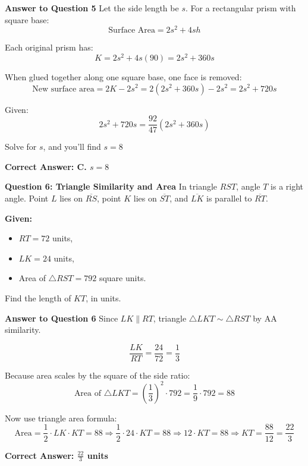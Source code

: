 \documentclass{beamer}
\begin{document}
\begin{frame}{\textbf{Answer to Question 5}}
Let the side length be \( s \). For a rectangular prism with square base:
\[
\text{Surface Area} = 2s^2 + 4sh
\]

Each original prism has:
\[
K = 2s^2 + 4s(90) = 2s^2 + 360s
\]

When glued together along one square base, one face is removed:
\[
\text{New surface area} = 2K - 2s^2 = 2(2s^2 + 360s) - 2s^2 = 2s^2 + 720s
\]

Given:
\[
2s^2 + 720s = \frac{92}{47}(2s^2 + 360s)
\]

Solve for \( s \), and you’ll find \( s = 8 \)

\textbf{Correct Answer: C. \( s = 8 \)}
\end{frame}






\begin{frame}{\textbf{Question 6: Triangle Similarity and Area}}
In triangle \( RST \), angle \( T \) is a right angle. Point \( L \) lies on \( \overline{RS} \), point \( K \) lies on \( \overline{ST} \), and \( \overline{LK} \) is parallel to \( \overline{RT} \).

\textbf{Given:}
\begin{itemize}
    \item \( RT = 72 \) units,
    \item \( LK = 24 \) units,
    \item Area of \( \triangle RST = 792 \) square units.
\end{itemize}

Find the length of \( KT \), in units.
\end{frame}


\begin{frame}{\textbf{Answer to Question 6}}
Since \( LK \parallel RT \), triangle \( \triangle LKT \sim \triangle RST \) by AA similarity.

\[
\frac{LK}{RT} = \frac{24}{72} = \frac{1}{3}
\]

Because area scales by the square of the side ratio:
\[
\text{Area of } \triangle LKT = \left( \frac{1}{3} \right)^2 \cdot 792 = \frac{1}{9} \cdot 792 = 88
\]

Now use triangle area formula:
\[
\text{Area} = \frac{1}{2} \cdot LK \cdot KT = 88
\Rightarrow \frac{1}{2} \cdot 24 \cdot KT = 88
\Rightarrow 12 \cdot KT = 88
\Rightarrow KT = \frac{88}{12} = \frac{22}{3}
\]

\textbf{Correct Answer: \( \boxed{\frac{22}{3}} \) units}
\end{frame}
\end{document}
